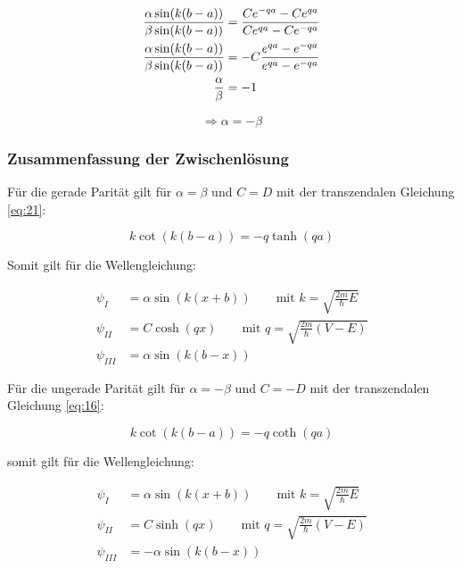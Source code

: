 \begin{align}
  \label{eq:24_2}
\frac{\alpha\sin(k(b-a))}{\beta\sin(k(b-a))} &= \frac{Ce^{-qa}-Ce^{qa}}{Ce^{qa}-Ce^{-qa}}  \notag\\
\frac{\alpha\sin(k(b-a))}{\beta\sin(k(b-a))} &= -C\frac{e^{qa}-e^{-qa}}{e^{qa}-e^{-qa}} \notag \\
\frac{\alpha}{\beta} &= -1
\end{align}

\begin{equation}
  \label{eq:24_3}
 \Rightarrow  \alpha = -\beta
\end{equation}


\subsubsection{Zusammenfassung der Zwischenlösung}

Für die gerade Parität gilt für \(\alpha=\beta\) und \(C=D\) mit der transzendalen Gleichung \eqref{eq:21}:

\begin{equation}
  \label{eq:25}
  \boxed{k\cot(k(b-a)) = -q \tanh(qa)}
\end{equation}

Somit gilt für die Wellengleichung:

\begin{align}
  \label{eq:26}
  \psi_{I} &= \alpha \sin(k(x+b))  \qquad \text{mit } k = \sqrt{\frac{2m}{\hbar}E}\\
  \psi_{II} &= C\cosh(qx) \qquad \text{mit } q = \sqrt{\frac{2m}{\hbar}(V-E)} \\
 \psi_{III} &= \alpha \sin(k(b-x))
\end{align}

Für die ungerade Parität gilt für \(\alpha=-\beta\) und \(C=-D\) mit der transzendalen Gleichung \eqref{eq:16}:

\begin{equation}
  \label{eq:27}
 \boxed{ k\cot(k(b-a)) = - q\coth(qa)}
\end{equation}

somit gilt für die Wellengleichung:

\begin{align}
  \label{eq:28}
  \psi_{I} &= \alpha \sin(k(x+b))  \qquad \text{mit } k = \sqrt{\frac{2m}{\hbar}E}\\
  \psi_{II} &= C\sinh(qx) \qquad \text{mit } q = \sqrt{\frac{2m}{\hbar}(V-E)} \\
 \psi_{III} &= -\alpha \sin(k(b-x))
\end{align}

